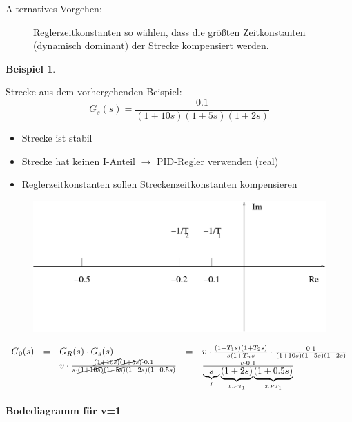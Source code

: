 \message{ !name(Mitschrieb_SysRegel.tex)}\documentclass[12pt,a4paper,ngerman]{scrartcl}
\newtheorem{bsp}{Beispiel}[section] %
\begin{document}
\begin{description}
\item[Alternatives Vorgehen:] Reglerzeitkonstanten so wählen, dass die größten Zeitkonstanten (dynamisch dominant) der Strecke kompensiert werden. 
\end{description}
\begin{bsp} 
\end{bsp}
Strecke aus dem vorhergehenden Beispiel:
\[
G_s(s)=\frac{0.1}{(1+10s)(1+5s)(1+2s)}
\]
\begin{itemize}
\item Strecke ist stabil \checkmark
\item Strecke hat keinen I-Anteil $\rightarrow$ PID-Regler verwenden (real)
\item Reglerzeitkonstanten sollen Streckenzeitkonstanten kompensieren
\end{itemize}

\begin{figure}[H]
  \centering
\includegraphics[width=0.7\linewidth]{sysregel_bsp_5_4}  
\end{figure}
\begin{align*}
  \begin{array}{lllll}
  G_0(s)&=&G_R(s)\cdot G_s(s)&=&v \cdot \frac{(1+T_1s)(1+T_2s)}{s(1+T_ns} \cdot \frac{0.1}{(1+10s)(1+5s)(1+2s)} \\
&=&v\cdot \frac{\cancel{(1+10s)}\cancel{(1+5s)}\cdot 0.1}{s\cdot \cancel{(1+10s)}\cancel{(1+5s)}(1+2s)(1+0.5s)}&=&\frac{v\cdot 0.1}{\underbrace{s}_{I}\underbrace{(1+2s)}_{1. PT_1}\underbrace{(1+0.5s)}_{2. PT_1}}
  \end{array}
\end{align*}

\paragraph{Bodediagramm für v=1}
\end{document}
